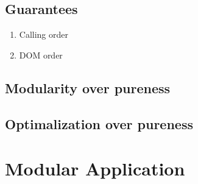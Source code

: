 \documentclass[runningheads]{llncs}
\begin{document}
\subsection{Guarantees}
\begin{enumerate}
  \item Calling order
  \item DOM order
\end{enumerate}

\subsection{Modularity over pureness}

\subsection{Optimalization over pureness}

\section{Modular Application}

\end{document}
